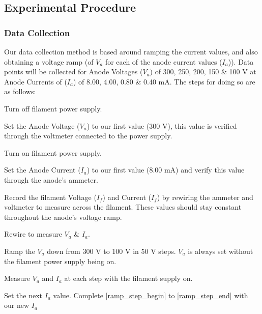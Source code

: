 \subsection{Experimental Procedure}

\subsubsection{Data Collection}

Our data collection method is based around ramping the current values, and also obtaining a voltage ramp (of $V_a$ for each of the anode current values ($I_a$)). Data points will be collected for Anode Voltages ($V_a$) of 300, 250, 200, 150 \& 100 V at Anode Currents of ($I_a$) of 8.00, 4.00, 0.80 \& 0.40 mA. The steps for doing so are as follows:\\

\begin{steps}
    \item Turn off filament power supply.
    \label{ramp_step_begin}
    
    \item Set the Anode Voltage ($V_a$) to our first value (300 V), this value is verified through the voltmeter connected to the power supply.
    
    \item Turn on filament power supply. 
    
    \item Set the Anode Current ($I_a$) to our first value (8.00 mA) and verify this value through the anode's ammeter.
    
    \item Record the filament Voltage ($I_f$) and Current ($I_f$) by rewiring the ammeter and voltmeter to measure across the filament. These values should stay constant throughout the anode's voltage ramp.
    
    \item Rewire to measure $V_a$ \& $I_a$. 
    
    \item Ramp the $V_a$ down from 300 V to 100 V in 50 V steps. $V_a$ is always set without the filament power supply being on. 
    
    \item Measure $V_a$ and $I_a$ at each step with the filament supply on.
    \label{ramp_step_end}
    
    \item Set the next $I_a$ value. Complete \ref{ramp_step_begin} to \ref{ramp_step_end} with our new $I_a$
    

\end{steps}

